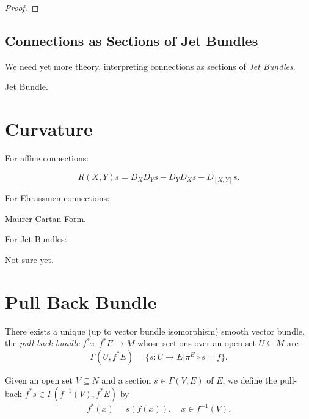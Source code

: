 \documentclass{amsart}
\begin{document}
\begin{proof}

\end{proof}

\subsection{Connections as Sections of Jet Bundles}

We need yet more theory, interpreting connections as sections of \emph{Jet Bundles}.

\begin{defn}
Jet Bundle.
\end{defn}

\section{Curvature}

For affine connections:

\begin{defn}
\[
R(X, Y) s = D_X D_Y s - D_Y D_X s - D_{[X, Y]} s.
\]
\end{defn}

For Ehrassmen connections:

\begin{defn}
Maurer-Cartan Form.
\end{defn}

For Jet Bundles:

\begin{defn}
Not sure yet.
\end{defn}

\section{Pull Back Bundle}

\begin{lemma}
There exists a unique (up to vector bundle isomorphism) smooth vector bundle, the \emph{pull-back bundle} \(f^{\ast} \pi : f^{\ast}E \to M\) whose sections over an open set \(U  \subseteq M\) are
\[
\Gamma(U, f^{\ast} E) = \{s : U \to E | \pi^E \circ s = f\}.
\]
\end{lemma}

\begin{defn}
Given an open set \(V \subseteq N\) and a section \(s \in \Gamma(V, E)\) of \(E\), we define the pull-back \(f^{\ast} s \in \Gamma(f^{-1}(V), f^{\ast} E)\) by
\[
f^{\ast} (x) = s(f(x)), \quad x \in f^{-1}(V).
\]
\end{defn}
\end{document}
